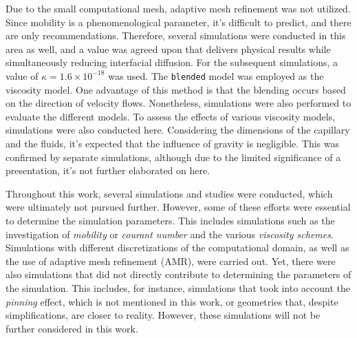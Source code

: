 Due to the small computational mesh, adaptive mesh refinement was not utilized. 
Since mobility is a phenomenological parameter, it's difficult to predict, and there are only recommendations. Therefore, several simulations were conducted in this area as well, and a value was agreed upon that delivers physical results while simultaneously reducing interfacial diffusion. For the subsequent simulations, a value of \(\kappa = 1.6 \times 10^{-18}\) was used.
The \texttt{blended} model was employed as the viscosity model. One advantage of this method is that the blending occurs based on the direction of velocity flows. Nonetheless, simulations were also performed to evaluate the different models.
To assess the effects of various viscosity models, simulations were also conducted here. 
Considering the dimensions of the capillary and the fluids, it's expected that the influence of gravity is negligible. This was confirmed by separate simulations, although due to the limited significance of a presentation, it's not further elaborated on here.

Throughout this work, several simulations and studies were conducted, which were ultimately not pursued further. However, some of these efforts were essential to determine the simulation parameters. This includes simulations such as the investigation of \textit{mobility} or \textit{courant number} and the various \textit{viscosity schemes}. Simulations with different discretizations of the computational domain, as well as the use of adaptive mesh refinement (AMR), were carried out. Yet, there were also simulations that did not directly contribute to determining the parameters of the simulation. This includes, for instance, simulations that took into account the \textit{pinning} effect, which is not mentioned in this work, or geometries that, despite simplifications, are closer to reality. However, these simulations will not be further considered in this work.

